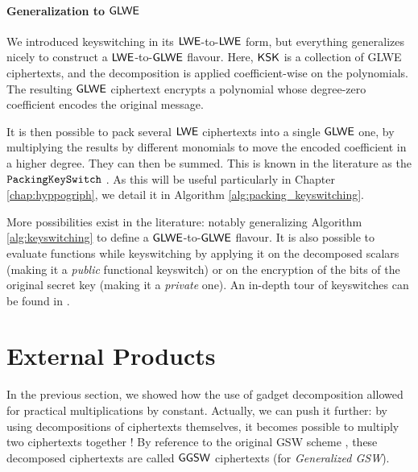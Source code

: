 




\paragraph{Generalization to $\textsf{GLWE}$}


We introduced keyswitching in its $\textsf{LWE}$-to-$\textsf{LWE}$ form, but everything generalizes nicely to construct a $\textsf{LWE}$-to-$\textsf{GLWE}$ flavour. Here, $\textsf{KSK}$ is a collection of GLWE ciphertexts, and the decomposition is applied coefficient-wise on the polynomials. The resulting $\textsf{GLWE}$ ciphertext encrypts a polynomial whose degree-zero coefficient encodes the original message.


It is then possible to pack several $\textsf{LWE}$ ciphertexts into a single $\textsf{GLWE}$ one, by multiplying the results by different monomials to move the encoded coefficient in a higher degree. They can then be summed. This is known in the literature as the $\texttt{PackingKeySwitch}~$. As this will be useful particularly in Chapter \ref{chap:hyppogriph}, we detail it in Algorithm \ref{alg:packing_keyswitching}.




More possibilities exist in the literature: notably generalizing Algorithm \ref{alg:keyswitching} to define a $\textsf{GLWE}$-to-$\textsf{GLWE}$ flavour. It is also possible to evaluate functions while keyswitching by applying it on the decomposed scalars (making it a \textit{public} functional keyswitch) or on the encryption of the bits of the original secret key (making it a \textit{private} one). An in-depth tour of keyswitches can be found in \cite{these_tap}.


\section{External Products}
\label{sec:external_products}

In the previous section, we showed how the use of gadget decomposition allowed for practical multiplications by constant. Actually, we can push it further: by using decompositions of ciphertexts themselves, it becomes possible to multiply two ciphertexts together ! By reference to the original GSW scheme \cite{C:GenSahWat13}, these decomposed ciphertexts are called $\textsf{GGSW}$ ciphertexts (for \textit{Generalized GSW}).


